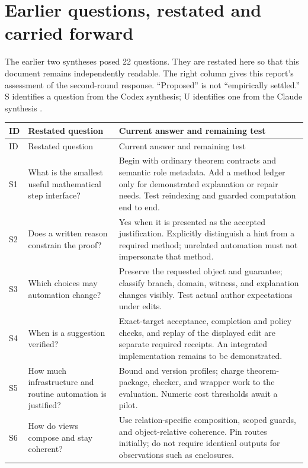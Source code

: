 \documentclass[11pt,letterpaper]{article}
\begin{document}


\clearpage
\section{Earlier questions, restated and carried forward}\label{app:oldquestions}
The earlier two syntheses posed 22 questions. They are restated here so that this
document remains independently readable. The right column gives this report's
assessment of the second-round response. ``Proposed'' is not ``empirically
settled.'' S identifies a question from the Codex synthesis; U identifies one
from the Claude synthesis \cite{round1,claude}.

{\small
\begin{longtable}{@{}P{.35in}P{2.05in}P{3.65in}@{}}
\toprule
ID & Restated question & Current answer and remaining test\\
\midrule\endfirsthead
\toprule ID & Restated question & Current answer and remaining test\\\midrule\endhead
\bottomrule\endfoot
S1 & What is the smallest useful mathematical step interface? & Begin with
ordinary theorem contracts and semantic role metadata. Add a method ledger only
for demonstrated explanation or repair needs. Test reindexing and guarded
computation end to end.\\
S2 & Does a written reason constrain the proof? & Yes when it is presented as the
accepted justification. Explicitly distinguish a hint from a required method;
unrelated automation must not impersonate that method.\\
S3 & Which choices may automation change? & Preserve the requested object and
guarantee; classify branch, domain, witness, and explanation changes visibly.
Test actual author expectations under edits.\\
S4 & When is a suggestion verified? & Exact-target acceptance, completion and
policy checks, and replay of the displayed edit are separate required receipts.
An integrated implementation remains to be demonstrated.\\
S5 & How much infrastructure and routine automation is justified? & Bound and
version profiles; charge theorem-package, checker, and wrapper work to the
evaluation. Numeric cost thresholds await a pilot.\\
S6 & How do views compose and stay coherent? & Use relation-specific composition,
scoped guards, and object-relative coherence. Pin routes initially; do not require
identical outputs for observations such as enclosures.\\

\end{longtable}}
\end{document}
